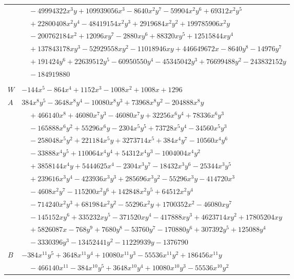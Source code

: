 \documentclass[11pt]{article}
\begin{document}
\begin{longtable}{@{}ll@{}}
 & $\quad -49994322x^{3}y+109939056x^{3}-8640x^{2}y^{7}-59904x^{2}y^{6}+69312x^{2}y^{5}$\\
 & $\quad +22800408x^{2}y^{4}-48419154x^{2}y^{3}+2919684x^{2}y^{2}+199785906x^{2}y$\\
 & $\quad -200762184x^{2}+12096xy^{7}-2880xy^{6}+88320xy^{5}+12515844xy^{4}$\\
 & $\quad +137843178xy^{3}-52929558xy^{2}-11018946xy+446649672x-8640y^{8}-14976y^{7}$\\
 & $\quad +191424y^{6}+22639512y^{5}-60950550y^{4}-45345042y^{3}+76699488y^{2}-243832152y$\\
 & $\quad -184919880$\\
\addlinespace[3pt]
\multicolumn{2}{@{}l}{$i=26$, $m=48$, neighbours $0,3,5,11,12,14,15,18,25,29,34$}\\
$W$ & $-144x^{5}-864x^{4}+1152x^{3}-1008x^{2}+1008x+1296$\\
$A$ & $384x^{8}y^{5}-3648x^{8}y^{4}-10080x^{8}y^{3}+73968x^{8}y^{2}-204888x^{8}y$\\
 & $\quad +466140x^{8}+46080x^{7}y^{3}-46080x^{7}y+32256x^{6}y^{4}+78336x^{6}y^{3}$\\
 & $\quad -165888x^{6}y^{2}+55296x^{6}y-2304x^{5}y^{5}+73728x^{5}y^{4}-34560x^{5}y^{3}$\\
 & $\quad -258048x^{5}y^{2}+221184x^{5}y+3273714x^{5}+384x^{4}y^{7}-10560x^{4}y^{6}$\\
 & $\quad -33888x^{4}y^{5}+110064x^{4}y^{4}+54312x^{4}y^{3}-1004004x^{4}y^{2}$\\
 & $\quad +3858144x^{4}y+5444625x^{4}-2304x^{3}y^{7}-18432x^{3}y^{6}-25344x^{3}y^{5}$\\
 & $\quad +239616x^{3}y^{4}-423936x^{3}y^{3}+285696x^{3}y^{2}-55296x^{3}y-414720x^{3}$\\
 & $\quad -4608x^{2}y^{7}-115200x^{2}y^{6}+142848x^{2}y^{5}+64512x^{2}y^{4}$\\
 & $\quad -714240x^{2}y^{3}+681984x^{2}y^{2}-55296x^{2}y+1700352x^{2}-46080xy^{7}$\\
 & $\quad -145152xy^{6}+335232xy^{5}-371520xy^{4}-417888xy^{3}+4623714xy^{2}+17805204xy$\\
 & $\quad +5826087x-768y^{9}+7680y^{8}-53760y^{7}-170880y^{6}+307392y^{5}+125088y^{4}$\\
 & $\quad -3330396y^{3}-13452441y^{2}-11229939y-1376790$\\
$B$ & $-384x^{11}y^{5}+3648x^{11}y^{4}+10080x^{11}y^{3}-55536x^{11}y^{2}+186456x^{11}y$\\
 & $\quad -466140x^{11}-384x^{10}y^{5}+3648x^{10}y^{4}+10080x^{10}y^{3}-55536x^{10}y^{2}$\\

\end{longtable}
\end{document}
